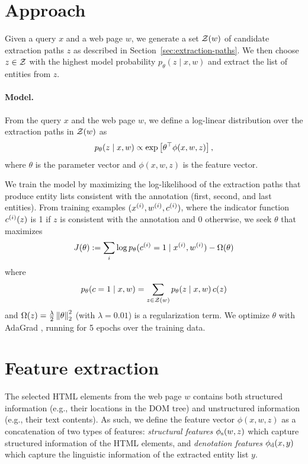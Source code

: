 \section{Approach}
Given a query $x$ and a web page $w$,
we generate a set $\mathcal{Z}(w)$
of candidate extraction paths $z$ as described
in Section~\ref{sec:extraction-paths}.
We then choose $z \in \mathcal{Z}$ with the highest
model probability
$p_\theta(z \mid x, w)$
and extract the list of entities from $z$.

\paragraph{Model.}
From the query $x$ and the web page $w$,
we define a log-linear distribution over
the extraction paths in $\mathcal{Z}(w)$ as
\begin{equation}
p_\theta(z \mid x, w) \propto \exp\left[ \theta^\top \phi(x,w,z) \right],
\end{equation}
where $\theta$ is the parameter vector
and $\phi(x,w,z)$ is the feature vector.

We train the model by maximizing the log-likelihood
of the extraction paths that
produce entity lists consistent with the annotation
(first, second, and last entities).
From training examples $(x^{(i)}, w^{(i)}, c^{(i)})$,
where the indicator function $c^{(i)}(z)$ is 1 if
$z$ is consistent with the annotation and 0 otherwise,
we seek $\theta$ that maximizes
\begin{equation}
J(\theta) := 
\sum_{i} \log p_\theta(c^{(i)} = 1 \mid x^{(i)}, w^{(i)}) - \Omega(\theta)
\end{equation}
where
\begin{equation}
p_\theta(c = 1 \mid x, w)
= \sum_{z \in \mathcal{Z}(w)} p_\theta(z \mid x, w)\,c(z)
\end{equation}
and $\Omega(z) = \frac{\lambda}{2}\left\| \theta\right\|_2^2$
(with $\lambda = 0.01$)
is a regularization term.
We optimize $\theta$ with AdaGrad \cite{duchi10adagrad},
running for 5 epochs over the training data.

\section{Feature extraction}\label{sec:openweb-features}

The selected HTML elements from the web page $w$
contains both structured information
(e.g., their locations in the DOM tree)
and unstructured information
(e.g., their text contents).
As such,
we define the feature vector $\phi(x, w, z)$
as a concatenation of two types of features:
\emph{structural features} $\phi_\mathrm{s}(w,z)$
which capture structured information of the HTML elements,
and \emph{denotation features} $\phi_\mathrm{d}(x, y)$
which capture the linguistic information
of the extracted entity list $y$.

